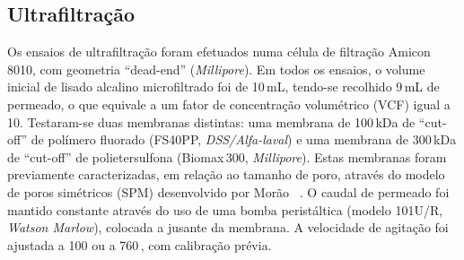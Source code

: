 \subsection{Ultrafiltração} %
\label{ssub:2.3art4}
%
Os ensaios de ultrafiltração foram efetuados numa célula de filtração Amicon 8010, com geometria ``dead-end'' (\emph{Millipore}).
%
Em todos os ensaios, o volume inicial de lisado alcalino microfiltrado foi de 10\,mL, tendo-se recolhido 9\,mL de permeado, o que equivale a um fator de concentração volumétrico (VCF) igual a 10.
%
Testaram-se duas membranas distintas: uma membrana de 100\,kDa de ``cut-off'' de polímero fluorado (FS40PP, \emph{DSS/Alfa-laval}) e uma membrana de 300\,kDa de ``cut-off'' de polietersulfona (Biomax\,300, \emph{Millipore}).
%
%
%
%
Estas membranas foram previamente caracterizadas, em relação ao tamanho de poro, através do modelo de poros simétricos (SPM) desenvolvido por Morão \et\ \cite{moraompa}.
%
O caudal de permeado foi mantido constante através do uso de uma bomba peristáltica (modelo 101U/R, \emph{Watson Marlow}), colocada a jusante da membrana. A velocidade de agitação foi ajustada a 100 ou a 760\,\minmum, com calibração prévia.
%   

